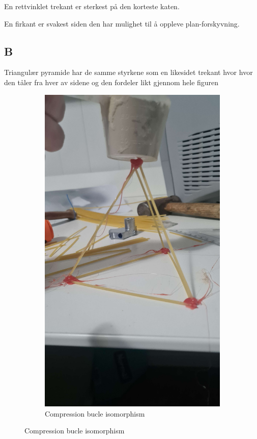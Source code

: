 \documentclass{report}
\newcommand{\subimgw}{.5\linewidth}
\begin{document}
En rettvinklet trekant er sterkest på den korteste katen.

En firkant er svakest siden den har mulighet til å oppleve plan-forskyvning.

\subsection{B}

Triangulær pyramide har de samme styrkene som en likesidet trekant hvor hvor den tåler fra hver av sidene og den fordeler likt gjennom hele figuren

\begin{figure}[H]
	\begin{subfigure}{.5\textwidth}
		\centering
		\includegraphics[width=\subimgw]{tetrehedra-a}
		\caption{Compression bucle isomorphism}


\end{subfigure}
\end{figure}
\end{document}

